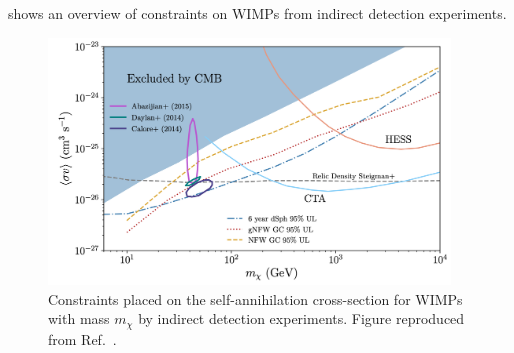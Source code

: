 shows an overview of constraints on WIMPs from indirect detection experiments.
\begin{figure}[htbp]
    \centering
    \includegraphics[width=0.95\textwidth]{figures/darkmatter/pdg_indirectdetection2020.png}
    \caption{Constraints placed on the self-annihilation cross-section for WIMPs with mass \(m_{\chi}\) by indirect detection experiments. Figure reproduced from Ref.~\cite{Tanabashi2018}.}
    \label{fig:dm:searches:id:overview}
\end{figure}

